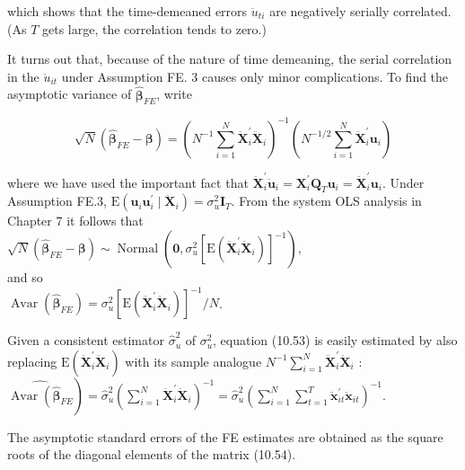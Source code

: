 \documentclass[10pt]{article}
\begin{document}
which shows that the time-demeaned errors $\ddot{u}_{t i}$ are negatively serially correlated. (As $T$ gets large, the correlation tends to zero.)

It turns out that, because of the nature of time demeaning, the serial correlation in the $\ddot{u}_{i t}$ under Assumption FE. 3 causes only minor complications. To find the asymptotic variance of $\hat{\boldsymbol{\beta}}_{F E}$, write

$$
\sqrt{N}\left(\hat{\boldsymbol{\beta}}_{F E}-\boldsymbol{\beta}\right)=\left(N^{-1} \sum_{i=1}^{N} \ddot{\mathbf{X}}_{i}^{\prime} \ddot{\mathbf{X}}_{i}\right)^{-1}\left(N^{-1 / 2} \sum_{i=1}^{N} \ddot{\mathbf{X}}_{i}^{\prime} \mathbf{u}_{i}\right)
$$

where we have used the important fact that $\ddot{\mathbf{X}}_{i}^{\prime} \ddot{\mathbf{u}}_{i}=\mathbf{X}_{i}^{\prime} \mathbf{Q}_{T} \mathbf{u}_{i}=\ddot{\mathbf{X}}_{i}^{\prime} \mathbf{u}_{i}$. Under Assumption FE.3, $\mathrm{E}\left(\mathbf{u}_{i} \mathbf{u}_{i}^{\prime} \mid \ddot{\mathbf{X}}_{i}\right)=\sigma_{u}^{2} \mathbf{I}_{T}$. From the system OLS analysis in Chapter 7 it follows that\\
$\sqrt{N}\left(\hat{\boldsymbol{\beta}}_{F E}-\boldsymbol{\beta}\right) \sim \operatorname{Normal}\left(\mathbf{0}, \sigma_{u}^{2}\left[\mathrm{E}\left(\ddot{\mathbf{X}}_{i}^{\prime} \ddot{\mathbf{X}}_{i}\right)\right]^{-1}\right)$,\\
and so\\
$\operatorname{Avar}\left(\hat{\boldsymbol{\beta}}_{F E}\right)=\sigma_{u}^{2}\left[\mathrm{E}\left(\ddot{\mathbf{X}}_{i}^{\prime} \ddot{\mathbf{X}}_{i}\right)\right]^{-1} / N$.

Given a consistent estimator $\hat{\sigma}_{u}^{2}$ of $\sigma_{u}^{2}$, equation (10.53) is easily estimated by also replacing $\mathrm{E}\left(\ddot{\mathbf{X}}_{i}^{\prime} \ddot{\mathbf{X}}_{i}\right)$ with its sample analogue $N^{-1} \sum_{i=1}^{N} \ddot{\mathbf{X}}_{i}^{\prime} \ddot{\mathbf{X}}_{i}$ :\\
$\left.\widehat{\operatorname{Avar}\left(\hat{\boldsymbol{\beta}}_{F E}\right.}\right)=\hat{\sigma}_{u}^{2}\left(\sum_{i=1}^{N} \ddot{\mathbf{X}}_{i}^{\prime} \ddot{\mathbf{X}}_{i}\right)^{-1}=\hat{\sigma}_{u}^{2}\left(\sum_{i=1}^{N} \sum_{t=1}^{T} \ddot{\mathbf{x}}_{i t}^{\prime} \ddot{\mathbf{x}}_{i t}\right)^{-1}$.

The asymptotic standard errors of the FE estimates are obtained as the square roots of the diagonal elements of the matrix (10.54).
\end{document}
